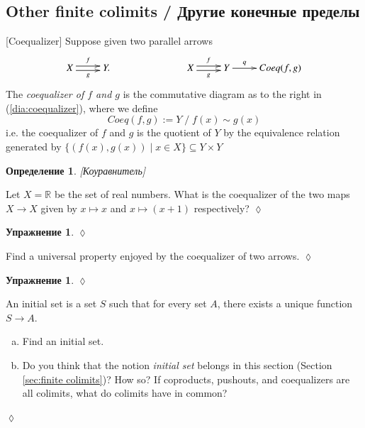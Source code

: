 \documentclass[a4paper]{book}
\def\RR{{\mathbb R}}
\def\to{\rightarrow}
\def\ss{\subseteq}
\def\|{{\;|\;}}
\theoremstyle{myth}
\newtheorem{excENG}[envENG]{\begin{english}Exercise\end{english}}
\newtheorem{definitionENG}[envENG]{\begin{english}Definition\end{english}}
\newenvironment{exerciseENG}{\begin{excENG}}{\hspace*{\fill}$\lozenge$\end{excENG}}
\newtheorem{excRUS}[envRUS]{Упражнение}
\newtheorem{definitionRUS}[envRUS]{Определение}
\newenvironment{exerciseRUS}{\begin{excRUS}}{\hspace*{\fill}$\lozenge$\end{excRUS}}
\def\sexc{\begin{enumerate}[a.)]\setlength{\itemsep}{.1cm}\setlength{\parskip}{.1cm}\item}
\def\next{\item}
\def\endsexc{\end{enumerate}}
\begin{document}
\begin{russian}

\subsection{Other finite colimits / Другие конечные пределы}

\begin{definitionENG}\label{def:coequalizer}[Coequalizer]
Suppose given two parallel arrows 
\begin{align}\label{dia:coequalizer}
\xymatrix{X\ar@<.5ex>[r]^f\ar@<-.5ex>[r]_g&Y.}\hspace{1in}\xymatrix{X\ar@<.5ex>[r]^f\ar@<-.5ex>[r]_g&Y\ar[r]^-q&Coeq(f,g)}
\end{align}
The {\em coequalizer of $f$ and $g$} is the commutative diagram as to the right in (\ref{dia:coequalizer}), where we define $$Coeq(f,g):=Y\;/\;f(x)\sim g(x)$$ i.e. the coequalizer of $f$ and $g$ is the quotient of $Y$ by the equivalence relation generated by $\{(f(x),g(x))\|x\in X\}\ss Y\times Y$
\end{definitionENG}

\begin{definitionRUS}\label{def:coequalizer}[Коуравнитель]
 
\end{definitionRUS}

\begin{exerciseENG}
Let $X=\RR$ be the set of real numbers. What is the coequalizer of the two maps $X\to X$ given by $x\mapsto x$ and $x\mapsto (x+1)$ respectively?
\end{exerciseENG}

\begin{exerciseRUS}
 
\end{exerciseRUS}

\begin{exerciseENG}
Find a universal property enjoyed by the coequalizer of two arrows.
\end{exerciseENG}

\begin{exerciseRUS}
 
\end{exerciseRUS}

\begin{exerciseENG}[Initial object]\label{exc:initial set}
An initial set is a set $S$ such that for every set $A$, there exists a unique function $S\to A$. 
\sexc Find an initial set. 
\next Do you think that the notion {\em initial set} belongs in this section (Section \ref{sec:finite colimits})? How so? If coproducts, pushouts, and coequalizers are all colimits, what do colimits have in common?
\endsexc
\end{exerciseENG}


\end{russian}
\end{document}
